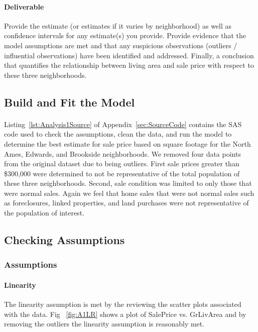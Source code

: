 \documentclass[11pt]{scrartcl} %
\begin{document}
\paragraph{Deliverable} Provide the estimate (or estimates if it varies by neighborhood) as well as confidence intervals for any estimate(s) you provide. Provide evidence that the model assumptions are met and that any suspicious observations (outliers / influential observations) have been identified and addressed. Finally, a conclusion that quantifies the relationship between living area and sale price with respect to these three neighborhoods.
\subsection{Build and Fit the Model}
\paragraph{} Listing~\ref{lst:Analysis1Source} of Appendix~\ref{sec:SourceCode} contains the SAS code used to check the assumptions, clean the data, and run the model to determine the best estimate for sale price based on square footage for the North Ames, Edwards, and Brookside neighborhoods. We removed four data points from the original dataset due to being outliers. First sale prices greater than \$300,000 were determined to not be representative of the total population of these three neighborhoods. Second, sale condition was limited to only those that were normal sales. Again we feel that home sales that were not normal sales such as foreclosures, linked properties, and land purchases were not representative of the population of interest.


\subsection{Checking Assumptions}
\subsubsection{Assumptions}
\paragraph{Linearity} The linearity assumption is met by the reviewing the scatter plots associated with the data. Fig ~\ref{fig:A1LR} shows a plot of SalePrice vs. GrLivArea and by removing the outliers the linearity assumption is reasonably met. 
\end{document}
